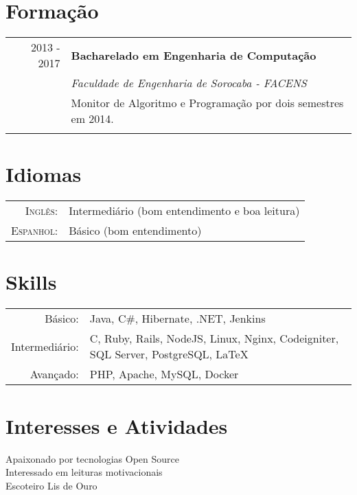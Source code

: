 \documentclass[a4paper,10pt]{article}
\begin{document}
\section{Formação}
\begin{tabular}{rl}	
 2013 - 2017 & \textbf{Bacharelado em Engenharia de Computação} \\
& \textit{Faculdade de Engenharia de Sorocaba - FACENS} \\
& Monitor de Algoritmo e Programação por dois semestres em 2014.\\&\\
\end{tabular}

\section{Idiomas}
\begin{tabular}{rl}
\textsc{Inglês:}&Intermediário (bom entendimento e boa leitura)\\
\textsc{Espanhol:}&Básico (bom entendimento)\\
\end{tabular}

\section{Skills}
\begin{tabular}{rl}
 Básico:& Java, C\#, Hibernate, .NET, Jenkins \setmainfont[SmallCapsFont=Fontin-SmallCaps.otf]{Fontin.otf}\\
 Intermediário:& C, Ruby, Rails, NodeJS, Linux, Nginx, Codeigniter, SQL Server, PostgreSQL, \LaTeX \\
 Avançado:& PHP, Apache, MySQL, Docker
\end{tabular}

\section{Interesses e Atividades}
Apaixonado por tecnologias Open Source\\
Interessado em leituras motivacionais \\
Escoteiro Lis de Ouro \\
\end{document}
